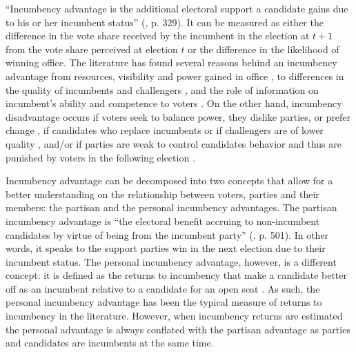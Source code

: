 \documentclass[12pt]{amsart}
\numberwithin{equation}{section}
\theoremstyle{definition}
\theoremstyle{definition}
\theoremstyle{definition}
\begin{document}
``Incumbency advantage is the additional electoral support a candidate gains due to his or her incumbent status'' (\citet{cox_morgensten_1993}, p. 329). It can be measured as either the difference in the vote share received by the incumbent in the election at $t+1$ from the vote share perceived at election $t$ or the difference in the likelihood of winning office. The literature has found several reasons behind an incumbency advantage from resources, visibility and power gained in office \citep{mayhew_1974, fiorina_1989, king_1991, cox_morgensten_1993}, to differences in the quality of incumbents and challengers \citep{cox_katz_1996, levitt_wolfram_1997, ansolabehere_snyder_2000, eggers_2017}, and the role of information on incumbent's ability and competence to voters \citep{ashworth_bdm_2008, ashworth_etal_2019}. On the other hand, incumbency disadvantage occurs if voters seek to balance power, they dislike parties, or prefer change  \citep{fowler_hall_2014, eggers_2017}, if candidates who replace incumbents or if challengers are of lower quality \citep{eggers_2017}, and/or if parties are weak to control candidates behavior and thus are punished by voters in the following election \citep{klasnja_titiunik_2017}.


Incumbency advantage can be decomposed into two concepts that allow for a better understanding on the relationship between voters, parties and their members: the partisan and the personal incumbency advantages. The partisan incumbency advantage is “the electoral benefit accruing to non-incumbent candidates by virtue of being from the incumbent party” (\citet{fowler_hall_2014}, p. 501). In other words, it speaks to the support parties win in the next election due to their incumbent status. The personal incumbency advantage, however, is a different concept: it is defined as the returns to incumbency that make a candidate better off as an incumbent relative to a candidate for an open seat \citep{fowler_hall_2014}. As such, the personal incumbency advantage has been the typical measure of returns to incumbency in the literature. However, when incumbency returns are estimated the personal advantage is always conflated with the partisan advantage as parties and candidates are incumbents at the same time. 
\end{document}

